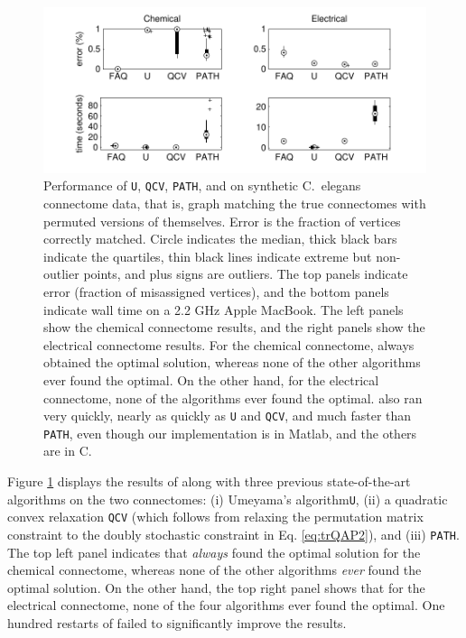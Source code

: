 \documentclass[10pt,journal,cspaper,compsoc]{IEEEtran}
\begin{document}
\begin{figure}[htbp]
	\centering
		\includegraphics[width=1.1\linewidth]{../figs/connectomes.pdf}
	\caption{Performance of \texttt{U}, \texttt{QCV}, \texttt{PATH}, and \FAQ on synthetic C.~elegans connectome data, that is, graph matching the true connectomes with permuted versions of themselves.  Error is the fraction of vertices correctly matched.  Circle indicates the median, thick black bars indicate the quartiles, thin black lines indicate extreme but non-outlier points, and plus signs are outliers. The top panels indicate error (fraction of misassigned vertices), and the bottom panels indicate wall time on a 2.2 GHz Apple MacBook.  The left panels show the chemical connectome results, and the right panels show the electrical connectome results. 	For the chemical connectome, \FAQ always obtained the optimal solution, whereas none of the other algorithms ever found the optimal.  On the other hand, for the electrical connectome, none of the algorithms ever found the optimal.  \FAQ also ran very quickly, nearly as quickly as \texttt{U} and \texttt{QCV}, and much faster than \texttt{PATH}, even though our \FAQ implementation is in Matlab, and the others are in C.}
	\label{fig:connectomes}
\end{figure}


Figure \ref{fig:connectomes} displays the results of \FAQ along with three previous state-of-the-art algorithms on the two connectomes: (i) Umeyama's algorithm\texttt{U}, (ii) a quadratic convex relaxation \texttt{QCV} (which follows from relaxing the permutation matrix constraint to the doubly stochastic constraint in Eq. \eqref{eq:trQAP2}), and (iii) \texttt{PATH}.  The top left panel indicates that \FAQ \emph{always} found the optimal solution for the chemical connectome, whereas none of the other algorithms \emph{ever} found the optimal solution.  On the other hand, the top right panel shows that for the electrical connectome, none of the four algorithms ever found the optimal. One hundred restarts of \FAQ failed to significantly improve the results. 
\end{document}
